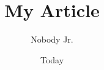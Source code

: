 \documentclass[11pt]{article}
\begin{document}
\title{My Article}
\author{Nobody Jr.}
\date{Today}
\maketitle



\nocite{*}
{}

\end{document}
